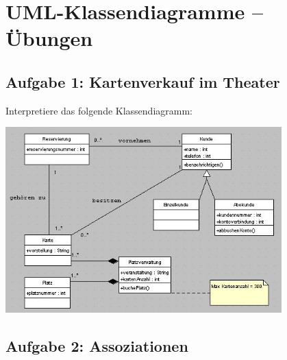 \clearpage

\rehead[]{\textcolor{lightblue}{AvHG, Inf, My}}
\lohead[]{\textcolor{lightblue}{AvHG, Inf, My}}

\section{UML-Klassendiagramme -- Übungen}

\subsection{Aufgabe 1: Kartenverkauf im Theater}

Interpretiere das folgende Klassendiagramm:

\includegraphics[width=0.8\textwidth]{./inf/SEKII/15_UML_Klassendiagramme/Aufgabe1.png}

\subsection{Aufgabe 2: Assoziationen}

